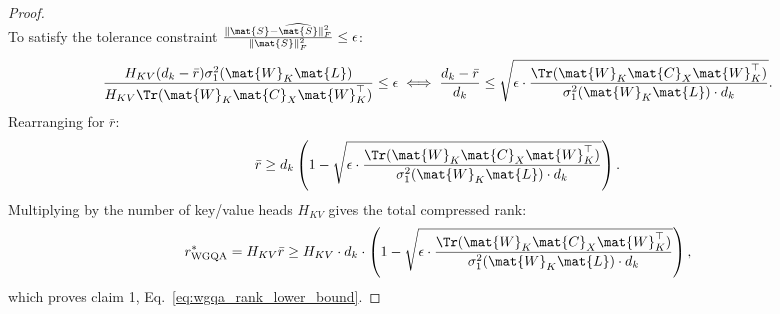\begin{proof}
\begin{equation}
\end{equation}
To satisfy the tolerance constraint $\frac{\|\mat{S} - \widehat{\mat{S}}\|_F^2}{\|\mat{S}\|_F^2} \le \epsilon$:
\begin{equation}
\frac{H_{KV} (d_k - \bar{r}) \sigma_1^2(\mat{W}_K \mat{L})}{H_{KV} \Tr(\mat{W}_K \mat{C}_X \mat{W}_K^\top)} \le \epsilon \iff \frac{d_k - \bar{r}}{d_k} \le \sqrt{\epsilon \cdot \frac{\Tr(\mat{W}_K \mat{C}_X \mat{W}_K^\top)}{\sigma_1^2(\mat{W}_K \mat{L}) \cdot d_k}}.
\end{equation}
Rearranging for $\bar{r}$:
\begin{equation}
\bar{r} \ge d_k \left( 1 - \sqrt{\epsilon \cdot \frac{\Tr(\mat{W}_K \mat{C}_X \mat{W}_K^\top)}{\sigma_1^2(\mat{W}_K \mat{L}) \cdot d_k}} \right).
\end{equation}
Multiplying by the number of key/value heads $H_{KV}$ gives the total compressed rank:
\begin{equation}
r_{\text{WGQA}}^* = H_{KV} \bar{r} \ge H_{KV} \cdot d_k \cdot \left( 1 - \sqrt{\epsilon \cdot \frac{\Tr(\mat{W}_K \mat{C}_X \mat{W}_K^\top)}{\sigma_1^2(\mat{W}_K \mat{L}) \cdot d_k}} \right),
\end{equation}
which proves claim 1, Eq.~\eqref{eq:wgqa_rank_lower_bound}.


\end{proof}
